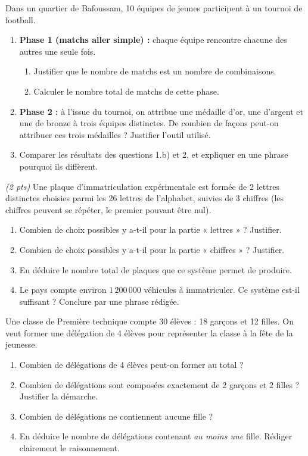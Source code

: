 \documentclass[11pt]{article}
\begin{document}
\begin{exercice}
Dans un quartier de Bafoussam, 10 équipes de jeunes participent à un tournoi de football.
\begin{enumerate}
\item \textbf{Phase 1 (matchs aller simple) :} chaque équipe rencontre chacune des autres une seule fois.
\begin{enumerate}
\item Justifier que le nombre de matchs est un nombre de combinaisons.
\item Calculer le nombre total de matchs de cette phase.
\end{enumerate}
\item \textbf{Phase 2 :} à l'issue du tournoi, on attribue une médaille d'or, une d'argent et une de bronze à trois équipes distinctes. De combien de façons peut-on attribuer ces trois médailles ? Justifier l'outil utilisé.
\item Comparer les résultats des questions 1.b) et 2, et expliquer en une phrase pourquoi ils diffèrent.
\end{enumerate}
\end{exercice}

\begin{exercice} \hfill \textit{(2 pts)}
Une plaque d'immatriculation expérimentale est formée de 2 lettres distinctes choisies parmi les 26 lettres de l'alphabet, suivies de 3 chiffres (les chiffres peuvent se répéter, le premier pouvant être nul).
\begin{enumerate}
\item Combien de choix possibles y a-t-il pour la partie « lettres » ? Justifier.
\item Combien de choix possibles y a-t-il pour la partie « chiffres » ? Justifier.
\item En déduire le nombre total de plaques que ce système permet de produire.
\item Le pays compte environ $1\,200\,000$ véhicules à immatriculer. Ce système est-il suffisant ? Conclure par une phrase rédigée.
\end{enumerate}
\end{exercice}

\begin{exercice}
Une classe de Première technique compte 30 élèves : 18 garçons et 12 filles. On veut former une délégation de 4 élèves pour représenter la classe à la fête de la jeunesse.
\begin{enumerate}
\item Combien de délégations de 4 élèves peut-on former au total ?
\item Combien de délégations sont composées exactement de 2 garçons et 2 filles ? Justifier la démarche.
\item Combien de délégations ne contiennent aucune fille ?
\item En déduire le nombre de délégations contenant \emph{au moins une} fille. Rédiger clairement le raisonnement.
\end{enumerate}
\end{exercice}
\end{document}

